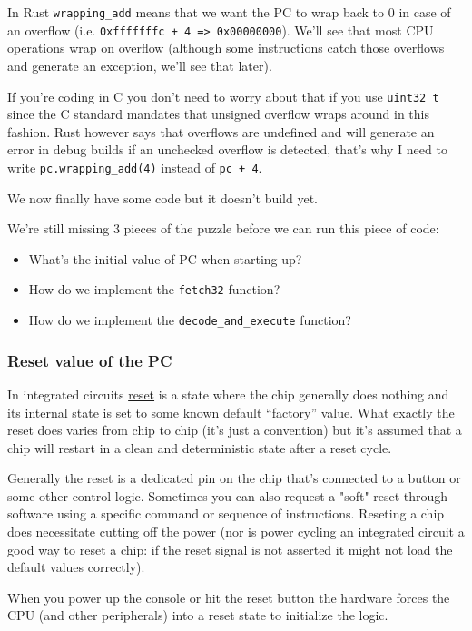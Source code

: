 \documentclass[a4paper]{article}
\newcommand{\code}[1] {\texttt{#1}}
\begin{document}
In Rust \code{wrapping\_add} means that we want the PC to
wrap back to 0 in case of an overflow (i.e. \code{0xfffffffc + 4 =>
0x00000000}). We'll see that most CPU operations wrap on overflow
(although some instructions catch those overflows and generate an
exception, we'll see that later).

If you're coding in C you don't need to worry about that if you use
\code{uint32\_t} since the C standard mandates that unsigned overflow wraps
around in this fashion. Rust however says that overflows are undefined
and will generate an error in debug builds if an unchecked overflow is
detected, that's why I need to write \code{pc.wrapping\_add(4)} instead of
\code{pc + 4}.

We now finally have some code but it doesn't build yet.

We're still missing 3 pieces of the puzzle before we can run this
piece of code:

\begin{itemize}
 \item What's the initial value of PC when starting up?
 \item How do we implement the \code{fetch32} function?
 \item How do we implement the \code{decode\_and\_execute} function?
\end{itemize}

\subsubsection{Reset value of the PC}

In integrated circuits
\href{https://en.wikipedia.org/wiki/Reset_%28computing%29}{reset} is a
state where the chip generally does nothing and its internal state
is set to some known default ``factory'' value. What exactly the
reset does varies from chip to chip (it's just a convention) but
it's assumed that a chip will restart in a clean and deterministic
state after a reset cycle.

Generally the reset is a dedicated pin on the chip that's connected to
a button or some other control logic. Sometimes you can also request a
"soft" reset through software using a specific command or sequence of
instructions. Reseting a chip does necessitate cutting off the power
(nor is power cycling an integrated circuit a good way to reset a
chip: if the reset signal is not asserted it might not load the
default values correctly).

When you power up the console or hit the reset button the hardware
forces the CPU (and other peripherals) into a reset state to
initialize the logic.
\end{document}
